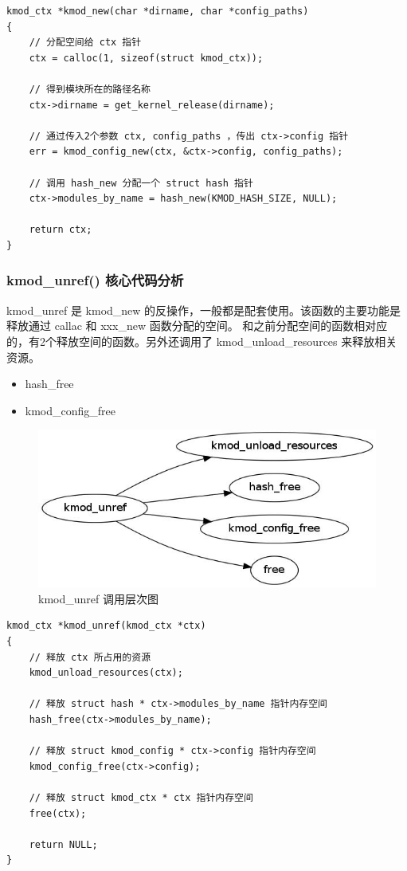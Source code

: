 \documentclass[11pt,a4paper]{article}
\makeatletter
\def\maxwidth{\ifdim\Gin@nat@width>\linewidth\linewidth
\else\Gin@nat@width\fi}
\let\Oldincludegraphics\includegraphics
\renewcommand{\includegraphics}[1]{\Oldincludegraphics[width=\maxwidth]{#1}}
\makeatother
\begin{document}
{\begin{shaded}\begin{verbatim}
kmod_ctx *kmod_new(char *dirname, char *config_paths)
{
    // 分配空间给 ctx 指针
    ctx = calloc(1, sizeof(struct kmod_ctx));

    // 得到模块所在的路径名称
    ctx->dirname = get_kernel_release(dirname);

    // 通过传入2个参数 ctx, config_paths ，传出 ctx->config 指针
    err = kmod_config_new(ctx, &ctx->config, config_paths);

    // 调用 hash_new 分配一个 struct hash 指针
    ctx->modules_by_name = hash_new(KMOD_HASH_SIZE, NULL);

    return ctx;
}
\end{verbatim}\end{shaded}}
\subsubsection{kmod\_unref() 核心代码分析}

kmod\_unref 是 kmod\_new
的反操作，一般都是配套使用。该函数的主要功能是释放通过 callac 和 xxx\_new
函数分配的空间。
和之前分配空间的函数相对应的，有2个释放空间的函数。另外还调用了
kmod\_unload\_resources 来释放相关资源。

\begin{itemize}
\item
  hash\_free
\item
  kmod\_config\_free
\end{itemize}
\begin{figure}[htbp]
\centering
\includegraphics{./figures/kmod_unref.jpg}
\caption{kmod\_unref 调用层次图}
\end{figure}

{\begin{shaded}\begin{verbatim}
kmod_ctx *kmod_unref(kmod_ctx *ctx)
{
    // 释放 ctx 所占用的资源
    kmod_unload_resources(ctx);

    // 释放 struct hash * ctx->modules_by_name 指针内存空间 
    hash_free(ctx->modules_by_name);

    // 释放 struct kmod_config * ctx->config 指针内存空间 
    kmod_config_free(ctx->config);

    // 释放 struct kmod_ctx * ctx 指针内存空间 
    free(ctx);

    return NULL;
}
\end{verbatim}\end{shaded}}
\end{document}
